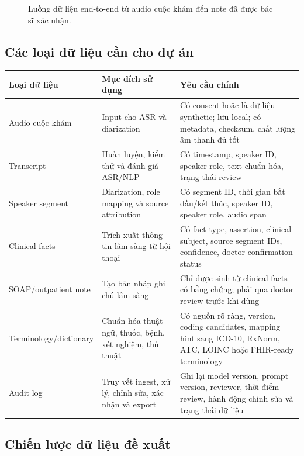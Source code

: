 \documentclass[12pt,a4paper]{article}
\begin{document}
\begin{figure}[htbp]
{
}
\caption{Luồng dữ liệu end-to-end từ audio cuộc khám đến note đã được bác sĩ xác nhận.}
\label{fig:data-flow-end-to-end}
\end{figure}

\subsection{Các loại dữ liệu cần cho dự án}

\begin{longtable}{p{3.6cm} p{5.2cm} p{5.2cm}}
\toprule
\textbf{Loại dữ liệu} & \textbf{Mục đích sử dụng} & \textbf{Yêu cầu chính} \\
\midrule
Audio cuộc khám & Input cho ASR và diarization & Có consent hoặc là dữ liệu synthetic; lưu local; có metadata, checksum, chất lượng âm thanh đủ tốt \\
\midrule
Transcript & Huấn luyện, kiểm thử và đánh giá ASR/NLP & Có timestamp, speaker ID, speaker role, text chuẩn hóa, trạng thái review \\
\midrule
Speaker segment & Diarization, role mapping và source attribution & Có segment ID, thời gian bắt đầu/kết thúc, speaker ID, speaker role, audio span \\
\midrule
Clinical facts & Trích xuất thông tin lâm sàng từ hội thoại & Có fact type, assertion, clinical subject, source segment IDs, confidence, doctor confirmation status \\
\midrule
SOAP/outpatient note & Tạo bản nháp ghi chú lâm sàng & Chỉ được sinh từ clinical facts có bằng chứng; phải qua doctor review trước khi dùng \\
\midrule
Terminology/dictionary & Chuẩn hóa thuật ngữ, thuốc, bệnh, xét nghiệm, thủ thuật & Có nguồn rõ ràng, version, coding candidates, mapping hint sang ICD-10, RxNorm, ATC, LOINC hoặc FHIR-ready terminology \\
\midrule
Audit log & Truy vết ingest, xử lý, chỉnh sửa, xác nhận và export & Ghi lại model version, prompt version, reviewer, thời điểm review, hành động chỉnh sửa và trạng thái dữ liệu \\
\bottomrule
\end{longtable}

\subsection{Chiến lược dữ liệu đề xuất}
\end{document}
